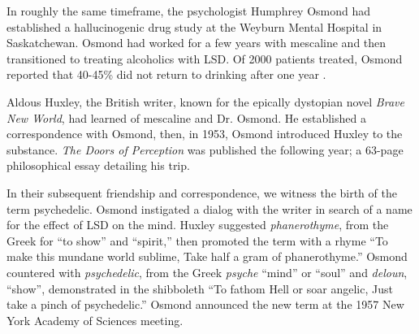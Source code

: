 \documentclass{UIdahoMastersThesis}
\begin{document}
In roughly the same timeframe, the psychologist Humphrey Osmond had established a hallucinogenic drug study at the Weyburn Mental Hospital in Saskatchewan. Osmond had worked for a few years with mescaline and then transitioned to treating alcoholics with LSD. Of 2000 patients treated, Osmond reported that 40-45\% did not return to drinking after one year \cite{dyck_hitting_2006}.

Aldous Huxley, the British writer, known for the epically dystopian novel \emph{Brave New World}, had learned of mescaline and Dr. Osmond. He established a correspondence with Osmond, then, in 1953, Osmond introduced Huxley to the substance. \emph{The Doors of Perception} was published the following year; a 63-page philosophical essay detailing his trip.

In their subsequent friendship and correspondence, we witness the birth of the term psychedelic. Osmond instigated a dialog with the writer in search of a name for the effect of LSD on the mind. Huxley suggested \emph{phanerothyme}, from the Greek for ``to show'' and ``spirit,'' then promoted the term with a rhyme \enquote{To make this mundane world sublime, Take half a gram of phanerothyme.} Osmond countered with \emph{psychedelic}, from the Greek \emph{psyche} ``mind'' or ``soul'' and \emph{deloun}, ``show'', demonstrated in the shibboleth \enquote{To fathom Hell or soar angelic, Just take a pinch of psychedelic.} Osmond announced the new term at the 1957 New York Academy of Sciences meeting. 

\newpage
\end{document}

